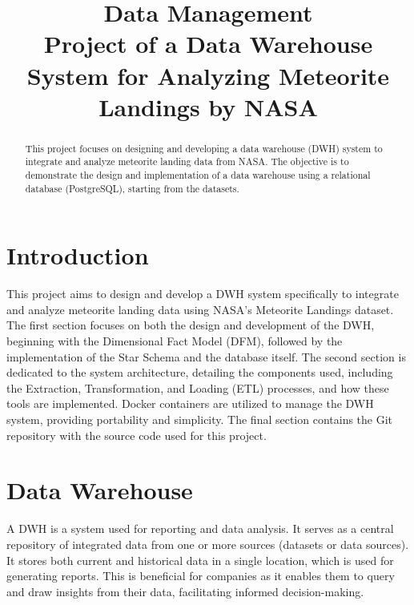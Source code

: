 \documentclass[conference]{IEEEtran}
\begin{document}
	
	\title{Data Management \\ Project of a Data Warehouse System for Analyzing Meteorite Landings by NASA}
	
	\author{
	}
	\maketitle
	
	\begin{abstract}
			This project focuses on designing and developing a data warehouse (DWH) system to integrate and analyze meteorite landing data from NASA. The objective is to demonstrate the design and implementation of a data warehouse using a relational database (PostgreSQL), starting from the datasets.
	\end{abstract}
	
	\section{Introduction}
	
	This project aims to design and develop a DWH system specifically to integrate and analyze meteorite landing data using NASA's Meteorite Landings dataset. The first section focuses on both the design and development of the DWH, beginning with the Dimensional Fact Model (DFM), followed by the implementation of the Star Schema and the database itself. The second section is dedicated to the system architecture, detailing the components used, including the Extraction, Transformation, and Loading (ETL) processes, and how these tools are implemented. Docker containers are utilized to manage the DWH system, providing portability and simplicity. The final section contains the Git repository with the source code used for this project.
	
	\section{Data Warehouse}
	A DWH is a system used for reporting and data analysis. It serves as a central repository of integrated data from one or more sources (datasets or data sources). It stores both current and historical data in a single location, which is used for generating reports. This is beneficial for companies as it enables them to query and draw insights from their data, facilitating informed decision-making.
\end{document}
